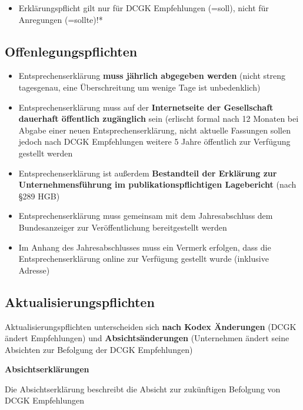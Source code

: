 \documentclass[
]{article}
\providecommand{\tightlist}{%
  \setlength{\itemsep}{0pt}\setlength{\parskip}{0pt}}
\begin{document}
\begin{itemize}
\tightlist
\item
  Erklärungspflicht gilt nur für DCGK Empfehlungen (=soll), nicht für
  Anregungen (=sollte)!*
\end{itemize}

\hypertarget{offenlegungspflichten}{%
\subsection{Offenlegungspflichten}\label{offenlegungspflichten}}

\begin{itemize}
\item
  Entsprechenserklärung \textbf{muss jährlich abgegeben werden} (nicht
  streng tagesgenau, eine Überschreitung um wenige Tage ist
  unbedenklich)
\item
  Entsprechenserklärung muss auf der \textbf{Internetseite der
  Gesellschaft dauerhaft öffentlich zugänglich} sein (erlischt formal
  nach 12 Monaten bei Abgabe einer neuen Entsprechenserklärung, nicht
  aktuelle Fassungen sollen jedoch nach DCGK Empfehlungen weitere 5
  Jahre öffentlich zur Verfügung gestellt werden
\item
  Entsprechenserklärung ist außerdem \textbf{Bestandteil der Erklärung
  zur Unternehmensführung im publikationspflichtigen Lagebericht} (nach
  §289 HGB)
\item
  Entsprechenserklärung muss gemeinsam mit dem Jahresabschluss dem
  Bundesanzeiger zur Veröffentlichung bereitgestellt werden
\item
  Im Anhang des Jahresabschlusses muss ein Vermerk erfolgen, dass die
  Entsprechenserklärung online zur Verfügung gestellt wurde (inklusive
  Adresse)
\end{itemize}

\hypertarget{aktualisierungspflichten}{%
\subsection{Aktualisierungspflichten}\label{aktualisierungspflichten}}

Aktualisierungspflichten unterscheiden sich \textbf{nach Kodex
Änderungen} (DCGK ändert Empfehlungen) und \textbf{Absichtsänderungen}
(Unternehmen ändert seine Absichten zur Befolgung der DCGK Empfehlungen)

\textbf{Absichtserklärungen}

Die Absichtserklärung beschreibt die Absicht zur zukünftigen Befolgung
von DCGK Empfehlungen
\end{document}
